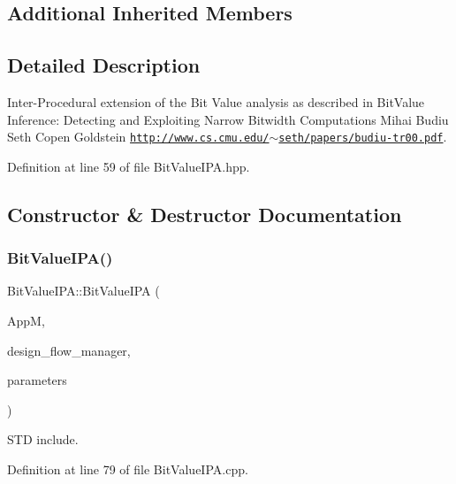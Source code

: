 \subsection*{Additional Inherited Members}


\subsection{Detailed Description}
Inter-\/\+Procedural extension of the Bit Value analysis as described in Bit\+Value Inference\+: Detecting and Exploiting Narrow Bitwidth Computations Mihai Budiu Seth Copen Goldstein \href{http://www.cs.cmu.edu/~seth/papers/budiu-tr00.pdf}{\tt http\+://www.\+cs.\+cmu.\+edu/$\sim$seth/papers/budiu-\/tr00.\+pdf}. 

Definition at line 59 of file Bit\+Value\+I\+P\+A.\+hpp.



\subsection{Constructor \& Destructor Documentation}
\mbox{\label{classBitValueIPA_aa139744d704f77b52956f5ee3a9fd80c}} 
\subsubsection{\texorpdfstring{Bit\+Value\+I\+P\+A()}{BitValueIPA()}}
{\footnotesize\ttfamily Bit\+Value\+I\+P\+A\+::\+Bit\+Value\+I\+PA (\begin{DoxyParamCaption}\item[{const \hyperlink{application__manager_8hpp_a04ccad4e5ee401e8934306672082c180}{application\+\_\+manager\+Ref}}]{AppM,  }\item[{const Design\+Flow\+Manager\+Const\+Ref}]{design\+\_\+flow\+\_\+manager,  }\item[{const \hyperlink{Parameter_8hpp_a37841774a6fcb479b597fdf8955eb4ea}{Parameter\+Const\+Ref}}]{parameters }\end{DoxyParamCaption})}



S\+TD include. 



Definition at line 79 of file Bit\+Value\+I\+P\+A.\+cpp.



